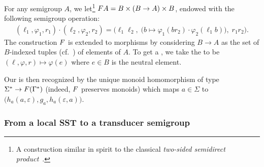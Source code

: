 For any semigroup $A$, we let\footnote{A construction similar in
  spirit to the classical \emph{two-sided semidirect
    product}~\cite[\S6]{rhodes1989kernel}.} $\functor A = B \times (B\to A) \times B$, endowed with the following semigroup operation:
\begin{align*}
  (\ell_1,\varphi_1,r_1) \cdot (\ell_2,\varphi_2,r_2) = \Big(\ell_1\ell_2,\; \big(b  \mapsto \varphi_1(br_2) \cdot \varphi_2(\ell_1b)\big),\; r_1r_2\Big).
\end{align*}
The construction $\functor$ is extended to morphisms by considering $B\to A$ as the set of $B$-indexed tuples (cf.~) of
elements of $A$. To get a , we take the  to
be $(\ell,\varphi,r) \mapsto \varphi(e)$ where $e \in B$ is the neutral element.

Our  is then recognized by the unique monoid homomorphism of
type $\Sigma^* \to \functor(\Gamma^*)$ (indeed, $\functor$ preserves monoids)
which maps $a \in \Sigma$ to
$\big(h_a(a,\varepsilon),g_a,h_a(\varepsilon,a)\big)$.

\subsubsection{From a local SST to a transducer semigroup}
\label{sec:local}

